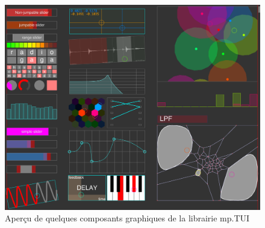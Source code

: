 \begin{figure}[!htbp]
	\includegraphics[width=\textwidth]{gfx/mpTUI/mp-TUI-preview.png}
	\caption{Aperçu de quelques composants graphiques de la librairie mp.TUI}
	\label{fig:visual_representation:mp.TUI}
\end{figure}


